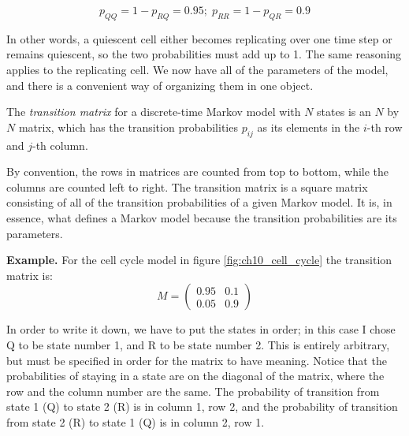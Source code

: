 \documentclass[
  letterpaper,
  DIV=11,
  numbers=noendperiod]{scrreprt}
\begin{document}
\[
p_{QQ} = 1 - p_{RQ} = 0.95; \; p_{RR} = 1 - p_{QR} = 0.9
\]

In other words, a quiescent cell either becomes replicating over one
time step or remains quiescent, so the two probabilities must add up to
1. The same reasoning applies to the replicating cell. We now have all
of the parameters of the model, and there is a convenient way of
organizing them in one object.

\begin{tcolorbox}[enhanced jigsaw, coltitle=black, arc=.35mm, opacitybacktitle=0.6, breakable, bottomtitle=1mm, toptitle=1mm, titlerule=0mm, colback=white, leftrule=.75mm, rightrule=.15mm, colframe=quarto-callout-note-color-frame, colbacktitle=quarto-callout-note-color!10!white, opacityback=0, title=\textcolor{quarto-callout-note-color}{\faInfo}\hspace{0.5em}{Definition}, left=2mm, toprule=.15mm, bottomrule=.15mm]

The \emph{transition matrix} for a discrete-time Markov model with \(N\)
states is an \(N\) by \(N\) matrix, which has the transition
probabilities \(p_{ij}\) as its elements in the \(i\)-th row and
\(j\)-th column.

\end{tcolorbox}

By convention, the rows in matrices are counted from top to bottom,
while the columns are counted left to right. The transition matrix is a
square matrix consisting of all of the transition probabilities of a
given Markov model. It is, in essence, what defines a Markov model
because the transition probabilities are its parameters.

\textbf{Example.} For the cell cycle model in figure
\ref{fig:ch10_cell_cycle} the transition matrix is: \[ 
M = \left(\begin{array}{cc}0.95 & 0.1 \\0.05 & 0.9\end{array}\right)
\]

In order to write it down, we have to put the states in order; in this
case I chose Q to be state number 1, and R to be state number 2. This is
entirely arbitrary, but must be specified in order for the matrix to
have meaning. Notice that the probabilities of staying in a state are on
the diagonal of the matrix, where the row and the column number are the
same. The probability of transition from state 1 (Q) to state 2 (R) is
in column 1, row 2, and the probability of transition from state 2 (R)
to state 1 (Q) is in column 2, row 1.
\end{document}
